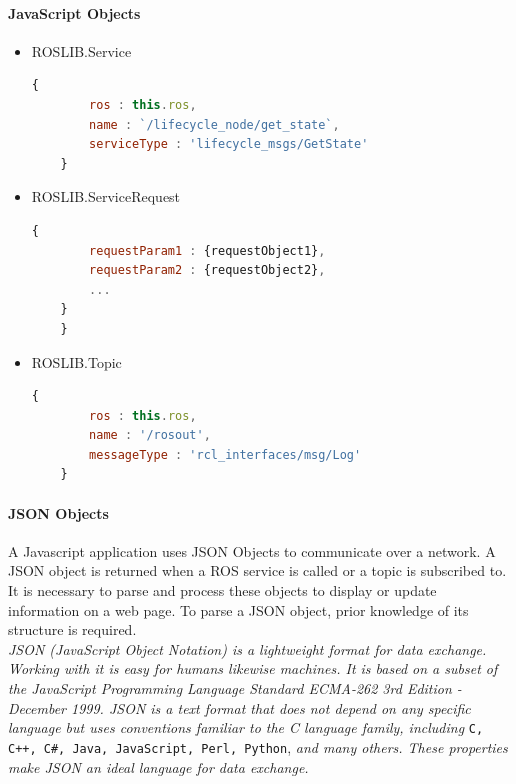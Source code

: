 \paragraph{JavaScript Objects}
\begin{itemize}

\item ROSLIB.Service
\begin{lstlisting}[language=JavaScript,
	label={JavsScript:ROSLIB.Service}
	caption={JavaScript object definition for Service}]
	{
		ros : this.ros,
		name : `/lifecycle_node/get_state`,
		serviceType : 'lifecycle_msgs/GetState'
	}
\end{lstlisting}

\item ROSLIB.ServiceRequest
\begin{lstlisting}[language=JavaScript,
	caption={JavaScript object definition for ServiceRequest}]
	{
		requestParam1 : {requestObject1},
		requestParam2 : {requestObject2},
		...
    }
	}
\end{lstlisting}


\item ROSLIB.Topic
\begin{lstlisting}[language=JavaScript,
	caption={JavaScript object definition for Topic}]
	{
		ros : this.ros,
		name : '/rosout',
		messageType : 'rcl_interfaces/msg/Log'
	}
\end{lstlisting}
\end{itemize}

\paragraph{JSON Objects} A Javascript application uses JSON Objects to communicate over a network. A JSON object is returned when a ROS service is called or a topic is subscribed to. It is necessary to parse and process these objects to display or update information on a web page. To parse a JSON object, prior knowledge of its structure is required. \\

 \textit{JSON (JavaScript Object Notation) is a lightweight format for data exchange. Working with it is easy for humans likewise machines. It is based on a subset of the JavaScript Programming Language Standard ECMA-262 3rd Edition - December 1999. JSON is a text format that does not depend on any specific language but uses conventions familiar to the C language family, including} \lstinline{C, C++, C#, Java, JavaScript, Perl, Python}, \textit{and many others. These properties make JSON an ideal language for data exchange.}\cite{jsonDef} \\

